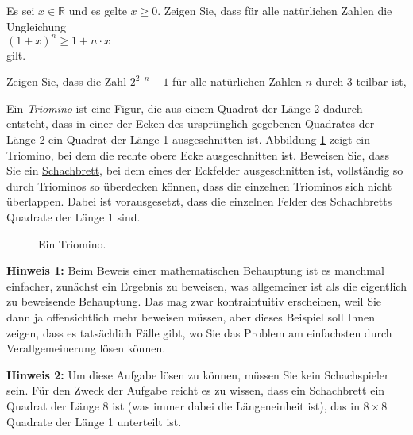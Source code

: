  
\exercise
Es sei $x \in \mathbb{R}$ und es gelte $x \geq 0$.  Zeigen Sie, dass für alle natürlichen Zahlen die Ungleichung
\\[0.2cm]
\hspace*{1.3cm}
$(1+x)^{n} \geq 1 + n \cdot x$
\\[0.2cm]
gilt.  
\exend


\exercise 
Zeigen Sie, dass die Zahl $2^{2 \cdot n} - 1$ für alle natürlichen Zahlen $n$ durch $3$
teilbar ist,
\exend 


\exercise
Ein \emph{Triomino} ist eine Figur, die aus einem Quadrat der Länge 2 dadurch entsteht, dass in
einer  der Ecken des ursprünglich gegebenen Quadrates der Länge 2 ein Quadrat der Länge 1
ausgeschnitten ist.  Abbildung \ref{fig:triomino.eps} zeigt 
ein Triomino, bei dem die rechte obere Ecke ausgeschnitten ist.  Beweisen Sie, dass Sie ein 
\href{http://de.wikipedia.org/wiki/Schachbrett}{Schachbrett}, bei dem eines der Eckfelder
ausgeschnitten ist, vollständig so durch Triominos so überdecken können, dass die einzelnen
Triominos sich nicht überlappen.  Dabei ist vorausgesetzt, dass die einzelnen Felder des
Schachbretts Quadrate der Länge 1 sind.

\begin{figure}[!ht]
  \centering
  \caption{Ein Triomino.}
  \label{fig:triomino.eps}
\end{figure}

\vspace*{0.2cm}
 
\noindent  
\textbf{Hinweis 1:}  Beim Beweis einer mathematischen Behauptung ist es manchmal einfacher, zunächst  
ein  Ergebnis zu beweisen, was allgemeiner ist als die eigentlich zu beweisende Behauptung.  Das mag  
zwar kontraintuitiv erscheinen, weil Sie dann ja offensichtlich mehr beweisen müssen, aber dieses  
Beispiel soll Ihnen zeigen, dass es tatsächlich Fälle gibt, wo Sie das Problem am einfachsten durch  
Verallgemeinerung lösen können.  
\vspace*{0.2cm}

\noindent
\textbf{Hinweis 2:}  Um diese Aufgabe lösen zu können, müssen Sie kein Schachspieler sein.
Für den Zweck der Aufgabe reicht es zu wissen, dass ein Schachbrett ein Quadrat der Länge 8 ist (was immer
dabei die Längeneinheit ist), das in $8 \times 8$ Quadrate der Länge 1 unterteilt ist.
\exend  

